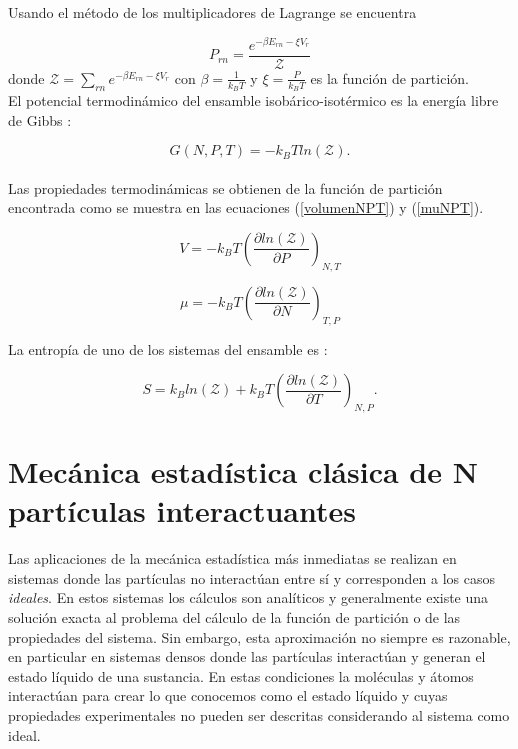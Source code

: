 Usando el método de los multiplicadores de Lagrange se encuentra

\begin{equation} \label{probNPT}
    P_{rn} = \frac{e^{-\beta E_{rn}-\xi V_r}}{\mathcal{Z}}
\end{equation}
\noindent donde $\mathcal{Z} = \sum_{rn} e^{-\beta E_{rn}-\xi V_r}$ con $\beta=\frac{1}{k_{B}T}$ y $\xi=\frac{P}{k_{B}T}$ es la función de partición.\\

El potencial termodinámico del ensamble isobárico-isotérmico es la energía libre de Gibbs \cite{mcquarrie1976}:

\begin{equation} \label{potgibbs}
    G(N,P,T)=-k_{B}Tln(\mathcal{Z}).
\end{equation}\\

Las propiedades termodinámicas se obtienen de la función de partición encontrada como se muestra en las ecuaciones (\ref{volumenNPT}) y (\ref{muNPT}).

\begin{equation} \label{volumenNPT}
    V=-k_{B}T\left(\frac{\partial ln(\mathcal{Z})}{\partial P}\right)_{N,T}
\end{equation}

\begin{equation} \label{muNPT}
    \mu =-k_{B}T\left(\frac{\partial ln(\mathcal{Z})}{\partial N}\right)_{T,P}
\end{equation}

La entropía de uno de los sistemas del ensamble es \cite{mcquarrie1976}:

\begin{equation} \label{entrpnpt}
    S = k_{B}ln(\mathcal{Z}) + k_{B}T\left( \frac{\partial ln(\mathcal{Z})}{\partial T} \right)_{N,P}.
\end{equation}

\section{Mecánica estadística clásica de N partículas interactuantes} \label{MecClasNpart}

Las aplicaciones de la mecánica estadística más inmediatas se realizan en sistemas donde las partículas no interactúan entre sí y corresponden a los casos \textit{ideales}. En estos sistemas los cálculos son analíticos y generalmente existe una solución exacta al problema del cálculo de la función de partición o de las propiedades del sistema. Sin embargo, esta aproximación no siempre es razonable, en particular en sistemas densos donde las partículas interactúan y generan el estado líquido de una sustancia. En estas condiciones la moléculas y átomos interactúan para crear lo que conocemos como el estado líquido y cuyas propiedades experimentales no pueden ser descritas considerando al sistema como ideal.\\

